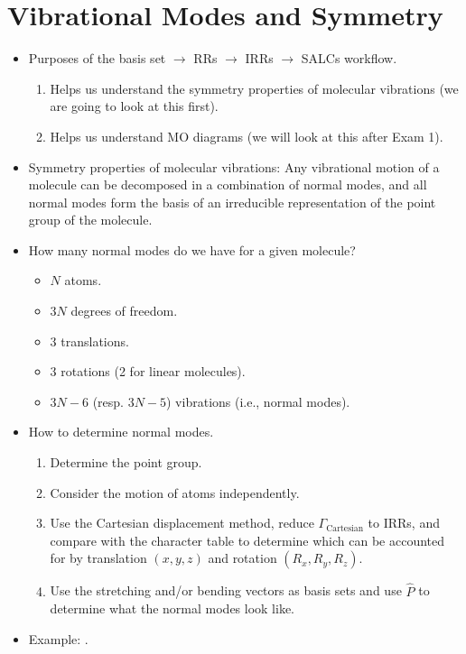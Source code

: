 \documentclass[../notes.tex]{subfiles}
\begin{document}
\section{Vibrational Modes and Symmetry}
\begin{itemize}
    \item {}Purposes of the basis set $\to$ RRs $\to$ IRRs $\to$ SALCs workflow.
    \begin{enumerate}
        \item Helps us understand the symmetry properties of molecular vibrations (we are going to look at this first).
        \item Helps us understand MO diagrams (we will look at this after Exam 1).
    \end{enumerate}
    \item Symmetry properties of molecular vibrations: Any vibrational motion of a molecule can be decomposed in a combination of normal modes, and all normal modes form the basis of an irreducible representation of the point group of the molecule.
    \item How many normal modes do we have for a given molecule?
    \begin{itemize}
        \item $N$ atoms.
        \item $3N$ degrees of freedom.
        \item 3 translations.
        \item 3 rotations (2 for linear molecules).
        \item $3N-6$ (resp. $3N-5$) vibrations (i.e., normal modes).
    \end{itemize}
    \item How to determine normal modes.
    \begin{enumerate}
        \item Determine the point group.
        \item Consider the motion of atoms independently.
        \item Use the Cartesian displacement method, reduce $\Gamma_\text{Cartesian}$ to IRRs, and compare with the character table to determine which can be accounted for by translation $(x,y,z)$ and rotation $(R_x,R_y,R_z)$.
        \item Use the stretching and/or bending vectors as basis sets and use $\hat{P}$ to determine what the normal modes look like.
    \end{enumerate}
    \item Example: .

\end{itemize}
\end{document}
